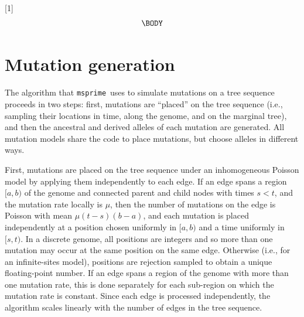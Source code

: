 \documentclass{article}
\newcommand{\msprime}[0]{\texttt{msprime}}
\begin{document}




 \newcommand{\be}{\begin{equation}}
 \newcommand{\ee}{\end{equation}}
 \newcommand{\bd}{\begin{displaymath}}
 \newcommand{\ed}{\end{displaymath}}
\newcommand{\IN}{\ensuremath{\mathds{N}}}%
\newcommand{\EE}[1]{\ensuremath{\mathds{E}\left[ #1 \right]}}%
\newcommand{\one}[1]{\ensuremath{\mathds{1}_{\left\{ #1 \right\}}}}%
\newcommand{\prb}[1]{\ensuremath{\mathds{P}\left( #1 \right) } }%

[1]{%
\begin{equation}
\label{#1}
\begin{split}
  \BODY
\end{split}\end{equation}
}

\setcounter{secnumdepth}{2} %

\appendix

\section*{Mutation generation}
\label{app-mutation-algorithm}

The algorithm that \msprime\ uses to simulate mutations on a tree sequence
proceeds in two steps:
first, mutations are ``placed'' on the tree sequence
(i.e., sampling their locations in time, along the genome, and on the marginal tree),
and then the ancestral and derived alleles of each mutation are generated.
All mutation models share the code to place mutations,
but choose alleles in different ways.

First, mutations are placed on the tree sequence under an inhomogeneous Poisson model
by applying them independently to each edge.
If an edge spans a region $[a, b)$ of the genome
and connected parent and child nodes with times $s < t$,
and the mutation rate locally is $\mu$,
then the number of mutations on the edge is Poisson with mean $\mu (t-s) (b-a)$,
and each mutation is placed independently at a position chosen uniformly in $[a,b)$
and a time uniformly in $[s,t)$.
In a discrete genome, all positions are integers and so more than one mutation
may occur at the same position on the same edge.
Otherwise (i.e., for an infinite-sites model),
positions are rejection sampled to obtain a unique floating-point number.
If an edge spans a region of the genome with more than one mutation rate,
this is done separately for each sub-region on which the mutation rate is constant.
Since each edge is processed independently, the algorithm
scales linearly with the number of edges in the tree sequence.
\end{document}
